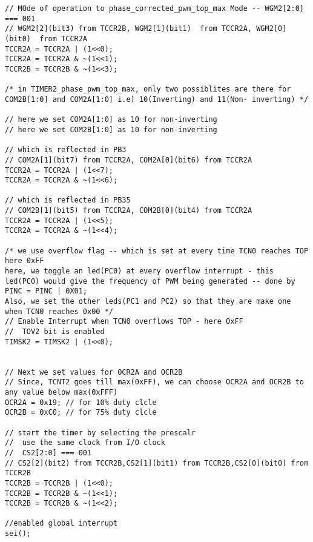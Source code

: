 \begin{verbatim}
// MOde of operation to phase_corrected_pwm_top_max Mode -- WGM2[2:0] === 001
// WGM2[2](bit3) from TCCR2B, WGM2[1](bit1)  from TCCR2A, WGM2[0](bit0)  from TCCR2A
TCCR2A = TCCR2A | (1<<0);
TCCR2A = TCCR2A & ~(1<<1);
TCCR2B = TCCR2B & ~(1<<3);	

/* in TIMER2_phase_pwm_top_max, only two possiblites are there for COM2B[1:0] and COM2A[1:0] i.e) 10(Inverting) and 11(Non- inverting) */

// here we set COM2A[1:0] as 10 for non-inverting
// here we set COM2B[1:0] as 10 for non-inverting

// which is reflected in PB3
// COM2A[1](bit7) from TCCR2A, COM2A[0](bit6) from TCCR2A
TCCR2A = TCCR2A | (1<<7);
TCCR2A = TCCR2A & ~(1<<6);

// which is reflected in PB35
// COM2B[1](bit5) from TCCR2A, COM2B[0](bit4) from TCCR2A
TCCR2A = TCCR2A | (1<<5);
TCCR2A = TCCR2A & ~(1<<4);

/* we use overflow flag -- which is set at every time TCN0 reaches TOP here 0xFF
here, we toggle an led(PC0) at every overflow interrupt - this led(PC0) would give the frequency of PWM being generated -- done by PINC = PINC | 0X01;
Also, we set the other leds(PC1 and PC2) so that they are make one when TCN0 reaches 0x00 */
// Enable Interrupt when TCN0 overflows TOP - here 0xFF
//  TOV2 bit is enabled
TIMSK2 = TIMSK2 | (1<<0);


// Next we set values for OCR2A and OCR2B
// Since, TCNT2 goes till max(0xFF), we can choose OCR2A and OCR2B to any value below max(0xFFF)
OCR2A = 0x19; // for 10% duty clcle
OCR2B = 0xC0; // for 75% duty clcle

// start the timer by selecting the prescalr
//  use the same clock from I/O clock
//  CS2[2:0] === 001
// CS2[2](bit2) from TCCR2B,CS2[1](bit1) from TCCR2B,CS2[0](bit0) from TCCR2B
TCCR2B = TCCR2B | (1<<0);
TCCR2B = TCCR2B & ~(1<<1);
TCCR2B = TCCR2B & ~(1<<2);

//enabled global interrupt
sei();
\end{verbatim}

